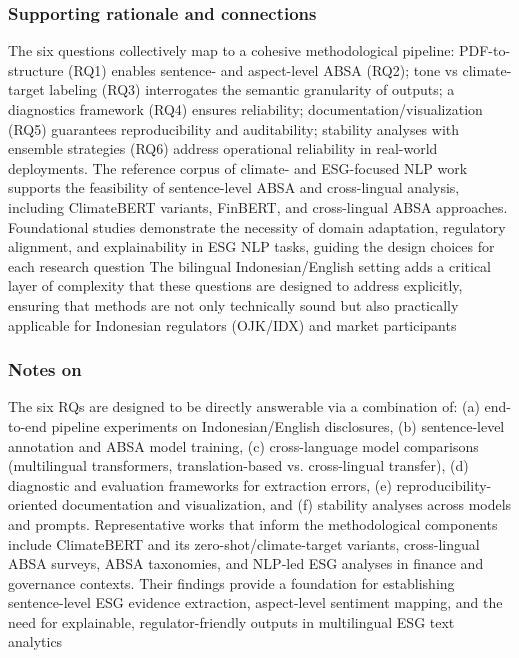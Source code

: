 \subsubsection{Supporting rationale and connections}
The six questions collectively map to a cohesive methodological pipeline: PDF-to-structure (RQ1) enables sentence- and aspect-level ABSA (RQ2); tone vs climate-target labeling (RQ3) interrogates the semantic granularity of outputs; a diagnostics framework (RQ4) ensures reliability; documentation/visualization (RQ5) guarantees reproducibility and auditability; stability analyses with ensemble strategies (RQ6) address operational reliability in real-world deployments.
The reference corpus of climate- and ESG-focused NLP work supports the feasibility of sentence-level ABSA and cross-lingual analysis, including ClimateBERT variants, FinBERT, and cross-lingual ABSA approaches. Foundational studies demonstrate the necessity of domain adaptation, regulatory alignment, and explainability in ESG NLP tasks, guiding the design choices for each research question \cite{10.21203/rs.3.rs-3600821/v1,10.1111/1475-679x.12625,10.18653/v1/2023.emnlp-main.975,10.48550/arxiv.2510.01222,10.2139/ssrn.3796152,10.1111/1911-3846.12832,10.1371/journal.pone.0288052,10.1051/e3sconf/202343602004,10.1108/dta-01-2024-0065}
The bilingual Indonesian/English setting adds a critical layer of complexity that these questions are designed to address explicitly, ensuring that methods are not only technically sound but also practically applicable for Indonesian regulators (OJK/IDX) and market participants \cite{10.22617/tcs210472-2,10.1108/mf-01-2023-0020,10.1007/s40804-021-00233-z,10.1111/eufm.12509}

\subsubsection{Notes on}
The six RQs are designed to be directly answerable via a combination of: (a) end-to-end pipeline experiments on Indonesian/English disclosures, (b) sentence-level annotation and ABSA model training, (c) cross-language model comparisons (multilingual transformers, translation-based vs. cross-lingual transfer), (d) diagnostic and evaluation frameworks for extraction errors, (e) reproducibility-oriented documentation and visualization, and (f) stability analyses across models and prompts.
Representative works that inform the methodological components include ClimateBERT and its zero-shot/climate-target variants, cross-lingual ABSA surveys, ABSA taxonomies, and NLP-led ESG analyses in finance and governance contexts. Their findings provide a foundation for establishing sentence-level ESG evidence extraction, aspect-level sentiment mapping, and the need for explainable, regulator-friendly outputs in multilingual ESG text analytics \cite{10.21203/rs.3.rs-3600821/v1,10.48550/arxiv.2510.01222,10.2139/ssrn.3796152,10.1111/1911-3846.12832,10.1371/journal.pone.0288052,10.1051/e3sconf/202343602004,10.1108/dta-01-2024-0065}